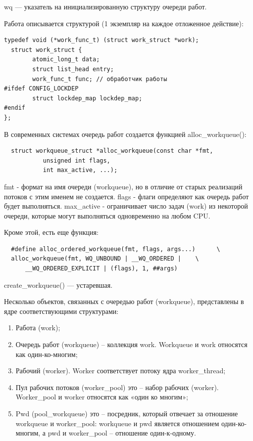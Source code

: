 wq --- указатель на инициализированную структуру очереди работ.

Работа описывается структурой (1 экземпляр на каждое отложенное действие):

\begin{lstlisting}
typedef void (*work_func_t) (struct work_struct *work);
  struct work_struct {
        atomic_long_t data;
        struct list_head entry;
        work_func_t func; // обработчик работы
#ifdef CONFIG_LOCKDEP
        struct lockdep_map lockdep_map;
#endif
};
\end{lstlisting}

В современных системах очередь работ создается функцией alloc\_workqueue():

\begin{lstlisting}
  struct workqueue_struct *alloc_workqueue(const char *fmt,
           unsigned int flags,
           int max_active, ...);
\end{lstlisting}

fmt - формат на имя очереди (workqueue), но в отличие от старых реализаций потоков с этим именем не создается. flags - флаги определяют как очередь работ будет выполняться. max\_active - ограничивает число задач (work) из некоторой очереди, которые могут выполняться одновременно на любом CPU.

Кроме этой, есть еще функция:
\begin{lstlisting}
  #define alloc_ordered_workqueue(fmt, flags, args...)      \
  alloc_workqueue(fmt, WQ_UNBOUND | __WQ_ORDERED |    \
      __WQ_ORDERED_EXPLICIT | (flags), 1, ##args)
\end{lstlisting}

create\_workqueue() --- устаревшая.

Несколько объектов, связанных с очередью работ (workqueue), представлены в ядре соответствующими структурами:
\begin{enumerate}
  \item Работа (work);
  \item Очередь работ (workqueue) – коллекция work. Workqueue и work относятся как один-ко-многим;
  \item Рабочий (worker). Worker соответствует потоку ядра worker\_thread;
  \item Пул рабочих потоков (worker\_pool) это – набор рабочих (worker). \\ Worker\_pool и worker относятся как «один ко многим»;
  \item Pwd (pool\_workqueue) это – посредник, который отвечает за отношение workqueue и worker\_pool: workqueue и pwd является отношением один-ко-многим, а pwd и worker\_pool – отношение один-к-одному.
\end{enumerate}


